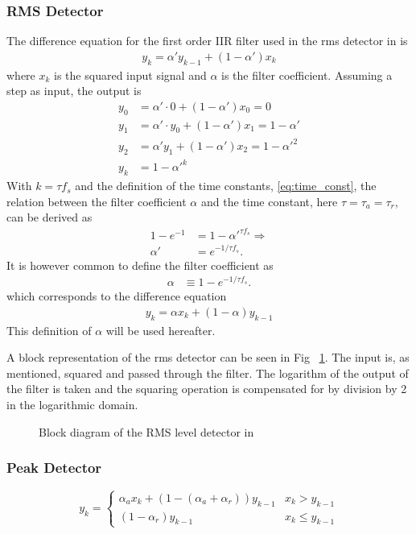 \documentclass[../main2.tex]{subfiles}
\providecommand{\rootdir}{..}
\begin{document}
\subsubsection{RMS Detector}
The difference equation for the first order IIR filter used in the rms detector in \cite{mcnally1984dynamic} is
\begin{align*}
y_k = \alpha' y_{k-1} + (1-\alpha') x_k
\end{align*}
where $x_k$ is the squared input signal and $\alpha$ is the filter coefficient. Assuming a step as input, the output is
\begin{align*}
y_0 &= \alpha' \cdot 0 + (1-\alpha')x_0 = 0 \\
y_1 &= \alpha' \cdot y_0 + (1-\alpha')x_1 = 1-\alpha'\\
y_2 &= \alpha' y_1 + (1-\alpha')x_2 = 1-\alpha'^2 \\
y_k &= 1-\alpha'^{k}
\end{align*}
With $k = \tau f_s$ and the definition of the time constants, \eqref{eq:time_const}, the relation between the filter coefficient $\alpha$ and the time constant, here $\tau = \tau_a = \tau_r$, can be derived as
\begin{align*}
1-e^{-1} &= 1-\alpha'^{\tau f_s} \Longrightarrow \\
\alpha' &= e^{-1/\tau f_s}.
\end{align*}
It is however common to define the filter coefficient as
\begin{align}
\alpha &\equiv 1-e^{-1/\tau f_s}.
\end{align}
which corresponds to the difference equation
\begin{align}
y_k = \alpha x_k + (1-\alpha) y_{k-1}
\end{align}
This definition of $\alpha$ will be used hereafter.

A block representation of the rms detector can be seen in Fig ~\ref{fig:block_mcnally_theory_rms}. The input is, as mentioned, squared and passed through the filter. The logarithm of the output of the filter is taken and the squaring operation is compensated for by division by 2 in the logarithmic domain.
\begin{figure}
\centerline{}
\caption{Block diagram of the RMS level detector in \cite{mcnally1984dynamic}}
\label{fig:block_mcnally_theory_rms}
\end{figure}
\subsubsection{Peak Detector}
\begin{equation}
y_k = \begin{cases}
    \alpha_{a} x_k + (1- (\alpha_{a} + \alpha_{r})) y_{k-1}  	& x_k > y_{k-1} \\
    (1-\alpha_{r}) y_{k-1} 								& x_k \leq y_{k-1}
\end{cases}
\end{equation}
\end{document}
